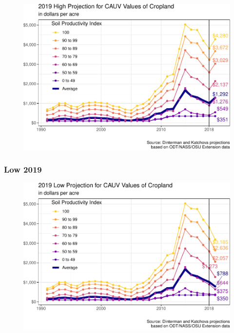 \documentclass[]{article}
\begin{document}
\begin{figure}[H]
\includegraphics[width=1\linewidth]{4-projections-2019-2020_files/figure-latex/high-trend-1} \caption{\label{fig:high-trend}}\label{fig:high-trend}
\end{figure}

\hypertarget{low-2019}{%
\subsubsection{Low 2019}\label{low-2019}}

\begin{figure}[H]
\includegraphics[width=1\linewidth]{4-projections-2019-2020_files/figure-latex/low-trend-1} \caption{\label{fig:low-trend}}\label{fig:low-trend}
\end{figure}
\end{document}
